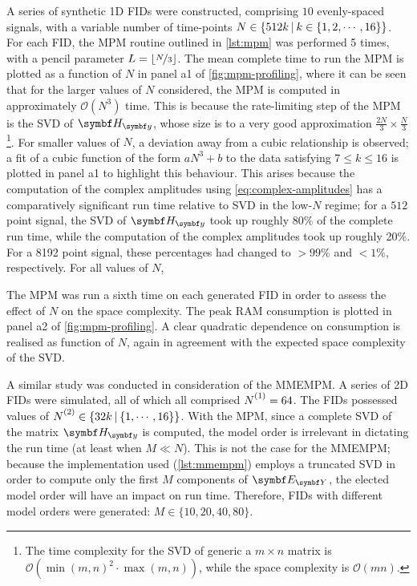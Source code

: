 A series of synthetic \ac{1D} \acp{FID} were constructed, comprising $10$ evenly-spaced
signals, with a
variable number of time-points $N \in \lbrace 512k \hspace*{2pt} \vert
\hspace*{2pt} k \in \lbrace 1, 2, \cdots, 16 \rbrace \rbrace$.
For each \ac{FID}, the \ac{MPM} routine outlined in \cref{lst:mpm} was
performed 5 times, with a pencil parameter $L = \lfloor
\nicefrac{N}{3} \rfloor$.
The mean complete time to run the \ac{MPM} is plotted as a function
of $N$ in panel a1 of \cref{fig:mpm-profiling}, where it can be seen that for
the larger values of $N$ considered, the \ac{MPM} is computed in approximately
$\mathcal{O}({N}^3)$ time. This is because the rate-limiting step of the
\ac{MPM} is the \ac{SVD} of $\Hy$, whose size is to a very good approximation
$\tfrac{2N}{3} \times \tfrac{N}{3}$\footnote{
    \label{fn:svd-complexity}
    The time complexity for the \ac{SVD} of generic a $m \times n$ matrix is
    $\mathcal{O}(\operatorname{min}(m, n)^2 \cdot \operatorname{max}(m, n))$,
    while the space complexity is $\mathcal{O}(mn)$.
}. For smaller values of $N$, a deviation
away from a cubic relationship is observed;
a fit of a cubic function of the form $aN^3 + b$ to the data satisfying $7 \leq k \leq
16$ is plotted in panel a1 to highlight this behaviour.
This arises because the computation of the complex amplitudes using
\cref{eq:complex-amplitudes} has a comparatively significant run time
relative to \ac{SVD} in the low-$N$ regime;
for a $512$ point signal, the \ac{SVD} of $\Hy$ took up roughly 80\% of the
complete run time, while the computation of the complex amplitudes took up
roughly 20\%. For a 8192 point signal, these percentages had changed to
$>\!\!99\%$ and $<\!\!1\%$, respectively.
For all values of $N$,

The \ac{MPM} was run a sixth time on each generated \ac{FID} in order to assess
the effect of $N$ on the space complexity.
The peak \ac{RAM} consumption is plotted in panel a2 of \cref{fig:mpm-profiling}.
A clear quadratic dependence on consumption is realised as function of $N$,
again in agreement with the expected space complexity of the
\ac{SVD}.

A similar study was conducted in consideration of the \ac{MMEMPM}. A
series of \ac{2D} \acp{FID} were simulated, all of which all comprised $\None =
64$. The \acp{FID} possessed values of $\Ntwo \in \lbrace 32k
\hspace*{2pt} \vert \hspace*{2pt} \lbrace 1, \cdots, 16 \rbrace \rbrace$.
With the \ac{MPM}, since a
complete \ac{SVD} of the matrix $\Hy$ is computed, the model order is
irrelevant in dictating the run time (at least when $M \ll N$). This is not the
case for the \ac{MMEMPM}; because the \Python implementation used
(\cref{lst:mmempm}) employs a truncated \ac{SVD} in order to compute only the
first $M$ components of $\EY$, the elected model order will have an impact on
run time.  Therefore, \acp{FID} with different model orders were generated: $M
\in \lbrace 10, 20, 40, 80 \rbrace$.

